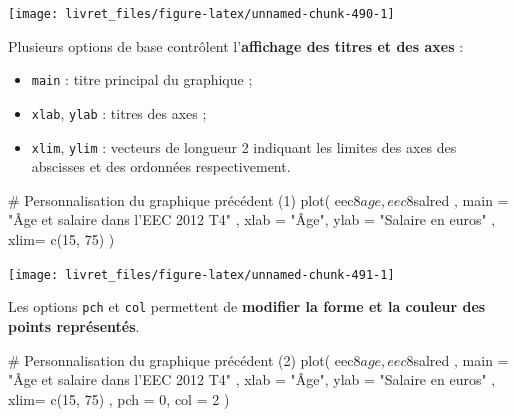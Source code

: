 \documentclass[12pt,twosided, notitlepage]{book}
\newenvironment{Shaded}{}{}
\newcommand{\KeywordTok}[1]{\textcolor[rgb]{0.00,0.00,1.00}{{#1}}}
\newcommand{\DataTypeTok}[1]{{#1}}
\newcommand{\DecValTok}[1]{{#1}}
\newcommand{\StringTok}[1]{\textcolor[rgb]{0.00,0.50,0.50}{{#1}}}
\newcommand{\CommentTok}[1]{\textcolor[rgb]{0.00,0.50,0.00}{{#1}}}
\newcommand{\NormalTok}[1]{{#1}}
\providecommand{\tightlist}{%
  \setlength{\itemsep}{0pt}\setlength{\parskip}{0pt}}
\renewenvironment{Shaded}{\begin{snugshade}}{\end{snugshade}}
\begin{document}
\begin{center}\texttt{[image: livret\_files/figure-latex/unnamed-chunk-490-1]} \end{center}

Plusieurs options de base contrôlent l'\textbf{affichage des titres et
des axes} :

\begin{itemize}
\tightlist
\item
  \texttt{main} : titre principal du graphique ;
\item
  \texttt{xlab}, \texttt{ylab} : titres des axes ;
\item
  \texttt{xlim}, \texttt{ylim} : vecteurs de longueur 2 indiquant les
  limites des axes des abscisses et des ordonnées respectivement.
\end{itemize}

\begin{Shaded}
\begin{Highlighting}[]
\CommentTok{# Personnalisation du graphique précédent (1)}
\KeywordTok{plot}\NormalTok{(}
  \NormalTok{eec8$age, eec8$salred}
  \NormalTok{, }\DataTypeTok{main =} \StringTok{"Âge et salaire dans l'EEC 2012 T4"}
  \NormalTok{, }\DataTypeTok{xlab =} \StringTok{"Âge"}\NormalTok{, }\DataTypeTok{ylab =} \StringTok{"Salaire en euros"}
  \NormalTok{, }\DataTypeTok{xlim=} \KeywordTok{c}\NormalTok{(}\DecValTok{15}\NormalTok{, }\DecValTok{75}\NormalTok{)}
\NormalTok{)}
\end{Highlighting}
\end{Shaded}

\begin{center}\texttt{[image: livret\_files/figure-latex/unnamed-chunk-491-1]} \end{center}

Les options \texttt{pch} et \texttt{col} permettent de \textbf{modifier
la forme et la couleur des points représentés}.

\begin{Shaded}
\begin{Highlighting}[]
\CommentTok{# Personnalisation du graphique précédent (2)}
\KeywordTok{plot}\NormalTok{(}
  \NormalTok{eec8$age, eec8$salred}
  \NormalTok{, }\DataTypeTok{main =} \StringTok{"Âge et salaire dans l'EEC 2012 T4"}
  \NormalTok{, }\DataTypeTok{xlab =} \StringTok{"Âge"}\NormalTok{, }\DataTypeTok{ylab =} \StringTok{"Salaire en euros"}
  \NormalTok{, }\DataTypeTok{xlim=} \KeywordTok{c}\NormalTok{(}\DecValTok{15}\NormalTok{, }\DecValTok{75}\NormalTok{)}
  \NormalTok{, }\DataTypeTok{pch =} \DecValTok{0}\NormalTok{, }\DataTypeTok{col =} \DecValTok{2}
\NormalTok{)}
\end{Highlighting}
\end{Shaded}
\end{document}
